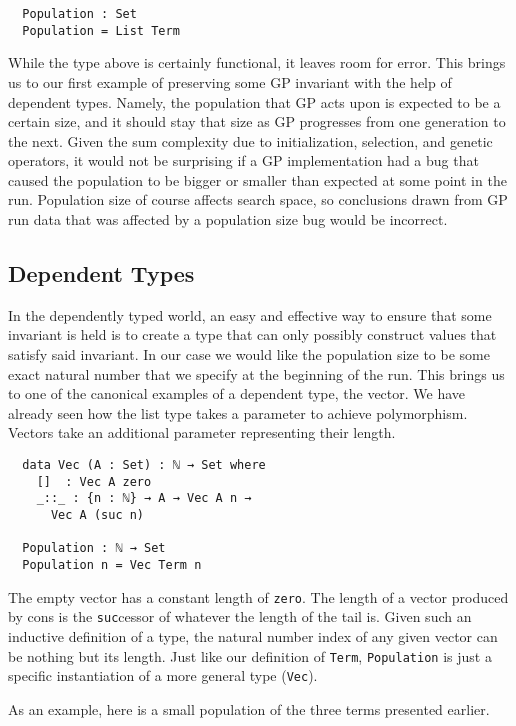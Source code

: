\documentclass{acm_proc_article-sp}
\begin{document}
\begin{verbatim}
  Population : Set
  Population = List Term
\end{verbatim}

While the type above is certainly functional, it leaves room for
error. This brings us to our first example of preserving some GP
invariant with the help of dependent types. Namely, the population
that GP acts upon is expected to be a certain size, and it should stay
that size as GP progresses from one generation to the next. Given the
sum complexity due to initialization, selection, and genetic
operators, it would not be surprising if a GP implementation had a bug
that caused the population to be bigger or smaller than expected
at some point in the run. Population size of course affects search
space, so conclusions drawn from GP run data that was affected by a
population size bug would be incorrect.

\subsection{Dependent Types}

In the dependently typed world, an easy and effective way to ensure
that some invariant is held is to create a type that can only possibly
construct values that satisfy said invariant. In our case we would
like the population size to be some exact natural number that we specify at the
beginning of the run. This brings us to one of the canonical examples
of a dependent type, the vector. We have already seen how the list
type takes a parameter to achieve polymorphism. Vectors take an
additional parameter representing their length.

\begin{verbatim}
  data Vec (A : Set) : ℕ → Set where
    []  : Vec A zero
    _::_ : {n : ℕ} → A → Vec A n →
      Vec A (suc n)

  Population : ℕ → Set
  Population n = Vec Term n
\end{verbatim}

The empty vector has a constant length of \texttt{zero}. The length of a vector
produced by cons is the \texttt{suc}cessor of whatever the length of
the tail is. Given such an inductive definition of a type, the natural
number index of any given vector can be nothing but its length. Just
like our definition of \texttt{Term}, \texttt{Population} is just a
specific instantiation of a more general type (\texttt{Vec}).

As an example, here is a small population of the three terms presented
earlier.
\end{document}
